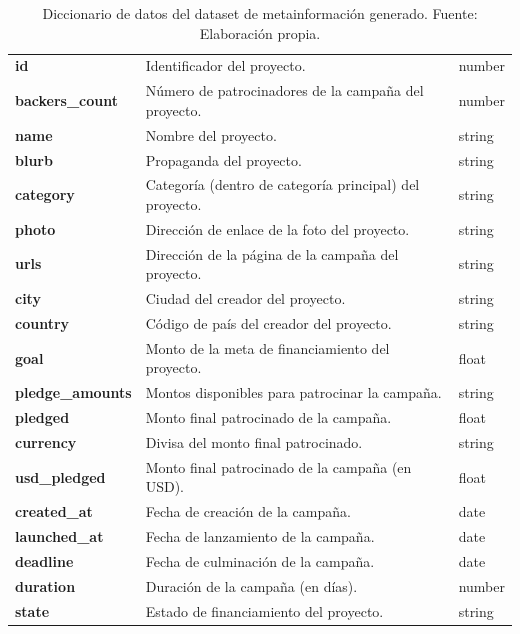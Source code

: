 \begin{table}[h!]
	\centering
	\small
	\begin{tabular}{ |m{3cm}|m{10cm}|m{2cm}|  }
		\hline
		\rowcolor{bluejean}
		\Centering \color{white}{Variable}& \Centering \color{white}{Detalle}& \Centering \color{white}{Tipo de dato}\\
		\hline
		\textbf{id} & Identificador del proyecto. & number \\
		\hline
		\textbf{backers\_count} & Número de patrocinadores de la campaña del proyecto. & number \\
		\hline
		\textbf{name} &	Nombre del proyecto. &	string \\
		\hline
		\textbf{blurb} & Propaganda del proyecto. & string \\
		\hline
		\textbf{category} & Categoría (dentro de categoría principal) del proyecto. & string \\
		\hline
		\textbf{photo} & Dirección de enlace de la foto del proyecto. & string \\
		\hline
		\textbf{urls} & Dirección de la página de la campaña del proyecto. & string \\
		\hline
		\textbf{city} & Ciudad del creador del proyecto. & string \\
		\hline
		\textbf{country} & Código de país del creador del proyecto. & string \\
		\hline
		\textbf{goal} &	Monto de la meta de financiamiento del proyecto. &	float \\
		\hline
		\textbf{pledge\_amounts} & Montos disponibles para patrocinar la campaña. & string \\
		\hline
		\textbf{pledged} & Monto final patrocinado de la campaña. & float \\
		\hline
		\textbf{currency} & Divisa del monto final patrocinado. & string \\
		\hline
		\textbf{usd\_pledged} & Monto final patrocinado de la campaña (en USD). & float \\
		\hline
		\textbf{created\_at} & Fecha de creación de la campaña. & date \\
		\hline
		\textbf{launched\_at} & Fecha de lanzamiento de la campaña. & date \\
		\hline
		\textbf{deadline} & Fecha de culminación de la campaña. & date \\
		\hline
		\textbf{duration} &	Duración de la campaña (en días). &	number \\
		\hline
		\textbf{state} & Estado de financiamiento del proyecto. & string \\
		\hline
	\end{tabular}
	\caption{Diccionario de datos del dataset de metainformación generado. Fuente: Elaboración propia.}
	\label{4:table1}
\end{table}

